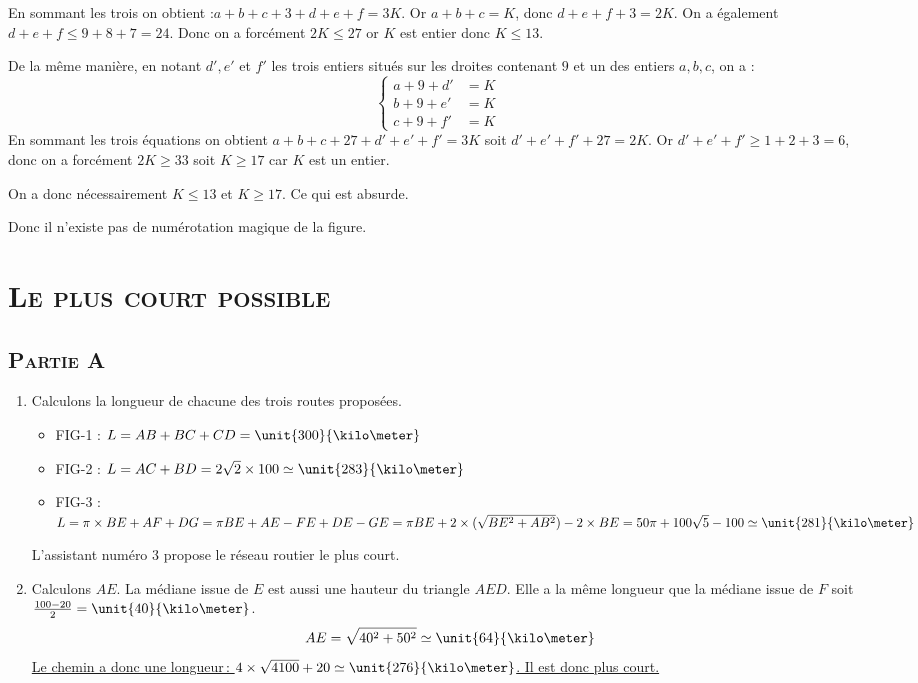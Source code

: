 \documentclass[10pt,a4paper]{article}
\begin{document}
\begin{enumerate}
En sommant les trois on obtient :$a+b+c+3+d+e+f=3K$. Or $a+b+c=K$, donc $d+e+f+3=2K$. On a également $d+e+f\leqslant 9+8+7=24$. Donc on a forcément 
$2K\leqslant 27$ or $K$ est entier donc $K\leqslant 13$.

De la même manière, en notant $d',e'$ et $f'$ les trois entiers situés sur les droites contenant $9$ et un des entiers $a,b,c$, on a :
$$\begin{cases}
a+9+d'&=K\\
b+9+e'&=K\\
c+9+f'&=K
\end{cases}$$
En sommant les trois équations on obtient $a+b+c+27+d'+e'+f'=3K$ soit $d'+e'+f'+27=2K$. Or $d'+e'+f'\geqslant 1+2+3=6$, donc on a forcément $2K\geqslant 33$
soit $K\geqslant 17$ car $K$ est un entier.

On a donc nécessairement $K\leqslant 13$ et $K\geqslant 17$. Ce qui est absurde.

Donc il n'existe pas de numérotation magique de la figure.
\end{enumerate}

\pagebreak
\section{\textsc{Le plus court possible}}
\subsection{\textsc{Partie A}}
\begin{enumerate}
\item Calculons la longueur de chacune des trois routes proposées.
\begin{itemize}
\item
FIG-1 : $L=AB+BC+CD=\unit{300}{\kilo\meter}$
\item FIG-2 : $L=AC+BD=2\sqrt{2}\times 100\simeq \unit{283}{\kilo\meter}$
\item FIG-3 : $L=\pi\times BE+AF+DG=\pi BE+AE-FE+DE-GE=\pi BE+2\times(\sqrt{BE^2+AB^2})-2\times BE = 50\pi+100\sqrt{5}-100\simeq\unit{281}{\kilo\meter}$
\end{itemize}
L'assistant numéro 3 propose le réseau routier le plus court.
\item Calculons $AE$. La médiane issue de $E$ est aussi une hauteur du triangle $AED$. Elle a la même longueur que la médiane issue de $F$ soit 
$\frac{100-20}{2}=\unit{40}{\kilo\meter}$.
$$AE=\sqrt{40^2+50^2}\simeq \unit{64}{\kilo\meter}$$
\underline{Le chemin a donc une longueur\,: $4\times\sqrt{4100}+20\simeq\unit{276}{\kilo\meter}$. Il est donc plus court.}
\end{enumerate}
\end{document}
